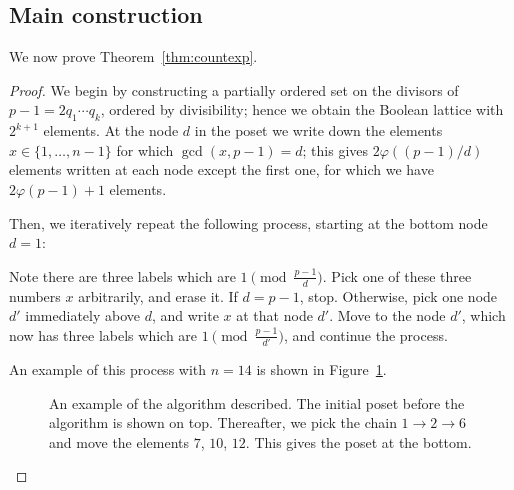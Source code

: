 \subsection{Main construction}
We now prove Theorem~\ref{thm:countexp}.
\begin{proof}
We begin by constructing a partially ordered set
on the divisors of $p-1 = 2q_1 \cdots q_k$, ordered by divisibility;
hence we obtain the Boolean lattice with $2^{k+1}$ elements.
At the node $d$ in the poset we write down the elements $x \in \{1, \dots, n-1\}$
for which $\gcd(x,p-1) = d$;
this gives $2\varphi( (p-1)/d )$ elements written at each node except the first one,
for which we have $2\varphi(p-1)+1$ elements.

Then, we iteratively repeat the following process,
starting at the bottom node $d=1$:
\begin{itemize}
	\ii Note there are three labels which are $1 \pmod{\frac{p-1}{d}}$.
	Pick one of these three numbers $x$ arbitrarily, and erase it.
	\ii If $d=p-1$, stop.
	Otherwise, pick one node $d'$ immediately above $d$,
	and write $x$ at that node $d'$.
	\ii Move to the node $d'$,
	which now has three labels which are $1 \pmod{\frac{p-1}{d'}}$,
	and continue the process.
\end{itemize}
An example of this process with $n=14$ is shown in Figure~\ref{fig:ex1}.

\begin{figure}[ht]
	\begin{center}
	\bigskip
	\end{center}
	\caption{An example of the algorithm described.
	The initial poset before the algorithm is shown on top.
	Thereafter, we pick the chain $1 \to 2 \to 6$
	and move the elements $7$, $10$, $12$.
	This gives the poset at the bottom.}
	\label{fig:ex1}
\end{figure}


\end{proof}
